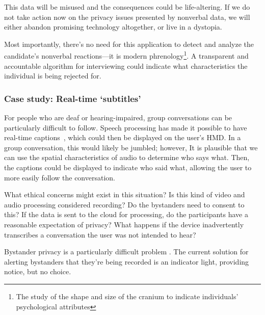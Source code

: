 This data will be misused and the consequences could be life-altering. If we do not take action now on the privacy issues presented by nonverbal data, we will either abandon promising technology altogether, or live in a dystopia.


Most importantly, there's no need for this application to detect and analyze the candidate's nonverbal reactions---it is modern phrenology\footnote{The study of the shape and size of the cranium to indicate individuals' psychological attributes}. A transparent and accountable algorithm for interviewing could indicate what characteristics the individual is being rejected for.


\subsubsection{Case study: Real-time `subtitles'}

For people who are deaf or hearing-impaired, group conversations can be particularly difficult to follow. Speech processing has made it possible to have real-time captions~\cite{welch}, which could then be displayed on the user's HMD. In a group conversation, this would likely be jumbled; however, It is plausible that we can use the spatial characteristics of audio to determine who says what. Then, the captions could be displayed to indicate who said what, allowing the user to more easily follow the conversation.

What ethical concerns might exist in this situation? Is this kind of video and audio processing considered recording? Do the bystanders need to consent to this? If the data is sent to the cloud for processing, do the participants have a reasonable expectation of privacy? What happens if the device inadvertently transcribes a conversation the user was not intended to hear?

Bystander privacy is a particularly difficult problem \cite{perez}. The current solution for alerting bystanders that they're being recorded is an indicator light, providing notice, but no choice. %


